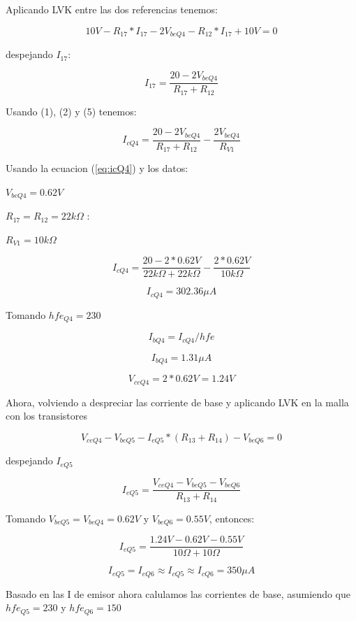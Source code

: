 Aplicando LVK entre las dos referencias tenemos:

$$10V - R_{17}*I_{17} - 2V_{beQ4} - R_{12}*I_{17} + 10V = 0$$

despejando $I_{17}$:

\begin{equation}
    I_{17} = \frac{20 - 2V_{beQ4}}{R_{17} + R_{12}}
\end{equation}

Usando (1), (2) y (5) tenemos:

\begin{equation}
    I_{cQ4} = \frac{20 - 2V_{beQ4}}{R_{17} + R_{12}} - \frac{2V_{beQ4}}{R_{V1}}
    \label{eq:icQ4}
\end{equation}

Usando la ecuacion (\ref{eq:icQ4}) y los datos:

$V_{beQ4} = 0.62 V$ 

$R_{17} = R_{12} = 22k\Omega$ :

$R_{V1} = 10k\Omega$ 

$$    I_{cQ4} = \frac{20 - 2 * 0.62 V}{22k\Omega + 22k\Omega} - \frac{2 * 0.62 V}{10 k\Omega} $$

$$ I_{cQ4} = 302.36 \mu A$$

Tomando $hfe_{Q4} = 230$

\begin{equation}
    I_{bQ4} = I_{cQ4} / hfe
\end{equation}

$$ I_{bQ4} = 1.31 \mu A$$

$$ V_{ceQ4} = 2 * 0.62 V = 1.24 V$$

Ahora, volviendo a despreciar las corriente de base y aplicando LVK en la malla con los transistores

$$V_{ceQ4} - V_{beQ5} - I_{eQ5}* (R_{13} + R_{14}) - V_{beQ6} = 0$$

despejando $I_{eQ5}$

\begin{equation}
    I_{eQ5} =\frac{ V_{ceQ4} - V_{beQ5} - V_{beQ6} }{R_{13} + R_{14}}
\end{equation}

Tomando $V_{beQ5} = V_{beQ4} = 0.62 V$ y $V_{beQ6} = 0.55 V$, entonces: 

$$I_{eQ5} = \frac{ 1.24 V - 0.62 V - 0.55 V }{10 \Omega + 10 \Omega }$$

$$ I_{eQ5} = I_{eQ6} \approx I_{cQ5} \approx I_{cQ6} = 350\mu A$$

Basado en las I de emisor ahora calulamos las corrientes de base, asumiendo que $hfe_{Q5} = 230 $ y $hfe_{Q6} = 150$

